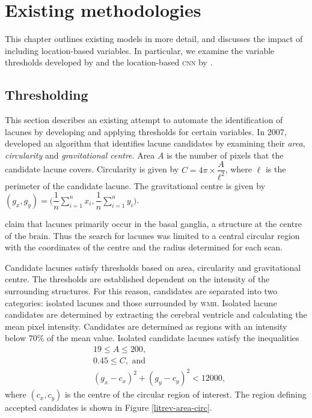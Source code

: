 %
%

\chapter{Existing methodologies}\label{litrev}

This chapter outlines existing models in more detail, and discusses the impact of including location-based variables. In particular, we examine the variable thresholds developed by \cite{Yokoyama2007} and the location-based \textsc{cnn} by \cite{GhafoorianM.2017Dml3}.

\section{Thresholding}\label{litrev-threshold}

This section describes an existing attempt to automate the identification of lacunes by developing and applying thresholds for certain variables. In 2007, \cite{Yokoyama2007} developed an algorithm that identifies lacune candidates by examining their \textit{area}, \textit{circularity} and \textit{gravitational centre}. Area $A$ is the number of pixels that the candidate lacune covers. Circularity is given by $C = 4\pi\times\dfrac{A}{\ell^2}$, where $\ell$ is the perimeter of the candidate lacune. The gravitational centre is given by $(g_x, g_y) = \bigg(\dfrac{1}{n}\sum_{i=1}^nx_i, \dfrac{1}{n}\sum_{i=1}^ny_i\bigg)$.

\cite{Yokoyama2007} claim that lacunes primarily occur in the basal ganglia, a structure at the centre of the brain. Thus the search for lacunes was limited to a central circular region with the coordinates of the centre and the radius determined for each scan.

Candidate lacunes satisfy thresholds based on area, circularity and gravitational centre. The thresholds are established dependent on the intensity of the surrounding structures. For this reason, candidates are separated into two categories: isolated lacunes and those surrounded by \textsc{wmh}. Isolated lacune candidates are determined by extracting the cerebral ventricle and calculating the mean pixel intensity. Candidates are determined as regions with an intensity below 70\% of the mean value. Isolated candidate lacunes satisfy the inequalities
\begin{align*}
	& 19 \le A \le 200, \\
	& 0.45 \le C,\text{ and } \\
	& (g_x - c_x)^2 + (g_y - c_y)^2 < 12000,
\end{align*}
where $(c_x, c_y)$ is the centre of the circular region of interest. The region defining accepted candidates is shown in Figure \ref{litrev-area-circ}.

